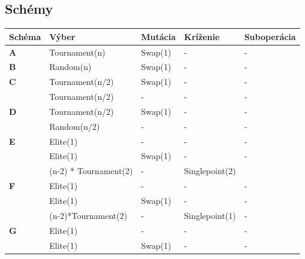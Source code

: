\subsection{Schémy}

\begin{table}[!h]
\centering
\begin{tabular}{@{}lllll@{}}
\toprule
\textbf{Schéma} & \textbf{Výber}            & \textbf{Mutácia} & \textbf{Kríženie} & \textbf{Suboperácia} \\ \midrule
\textbf{A}      & Tournament(n)             & Swap(1)          & -                 & -                    \\ \midrule
\textbf{B}      & Random(n)                 & Swap(1)          & -                 & -                    \\ \midrule
\textbf{C}      & Tournament(n/2)           & Swap(1)          & -                 & -                    \\
                & Tournament(n/2)           & -                & -                 & -                    \\ \midrule
\textbf{D}      & Tournament(n/2)           & Swap(1)          & -                 & -                    \\
                & Random(n/2)               & -                & -                 & -                    \\ \midrule
\textbf{E}      & Elite(1)                  & -                & -                 & -                    \\
                & Elite(1)                  & Swap(1)          & -                 & -                    \\
                & (n-2) * Tournament(2)     & -                & Singlepoint(2)    &                      \\ \midrule
\textbf{F}      & Elite(1)                  & -                & -                 & -                    \\
                & Elite(1)                  & Swap(1)          & -                 & -                    \\
                & (n-2)*Tournament(2)       & -                & Singlepoint(1)    & -                    \\ \midrule
\textbf{G}      & Elite(1)                  & -                & -                 & -                    \\
                & Elite(1)                  & Swap(1)          & -                 & -                    \\

\end{tabular}
\end{table}
